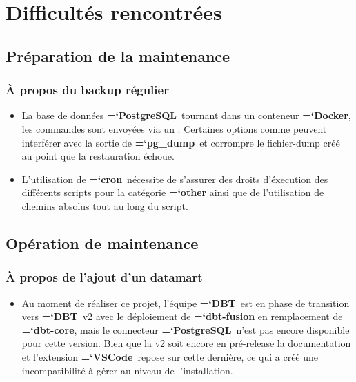 \documentclass[11pt]{article}
\newcommand{\inlinecode}[1]{\tcbox{\ttfamily\hyphenchar\font=`\-\color{codegray}#1}}
\newcommand{\program}[1]{{\ttfamily\bfseries\hyphenchar\font=`\-\color{Maroon}#1}}
\newcommand{\techno}[1]{{\ttfamily\bfseries\hyphenchar\font=`\-\color{Sienna}#1}}
\newcommand{\role}[1]{\colorbox{backcolor}{\ttfamily\bfseries\hyphenchar\font=`\-\color{ForestGreen}#1}}
\newcommand{\docker}{\techno{Docker}}
\newcommand{\postgresql}{\techno{PostgreSQL}}
\newcommand{\dbt}{\techno{DBT}}
\newcommand{\cron}{\program{cron}}
\newcommand{\pgdump}{\program{pg\_dump}}
\newcommand{\vscode}{\program{VSCode}}
\begin{document}
\section{Difficultés rencontrées}

\subsection{Préparation de la maintenance}

\subsubsection{À propos du backup régulier} \label{ann:backup_regulier_difficultes}

\begin{itemize}
    \item La base de données \postgresql\ tournant dans un conteneur \docker, les commandes sont envoyées via un \inlinecode{docker exec}. Certaines options comme \inlinecode{-t} peuvent interférer avec la sortie de \pgdump\ et corrompre le fichier-dump créé au point que la restauration échoue.
    \item L'utilisation de \cron\ nécessite de s'assurer des droits d'éxecution des différents scripts pour la catégorie \role{other} ainsi que de l'utilisation de chemins absolus tout au long du script.
\end{itemize}


\subsection{Opération de maintenance}

\subsubsection{À propos de l'ajout d'un datamart} \label{ann:ajout_datamart_difficultes}

\begin{itemize}
    \item Au moment de réaliser ce projet, l'équipe \dbt\ est en phase de transition vers \dbt\ v2 avec le déploiement de \techno{dbt-fusion} en remplacement de \techno{dbt-core}, mais le connecteur \postgresql\ n'est pas encore disponible pour cette version. Bien que la v2 soit encore en pré-release la documentation et l'extension \vscode\ repose sur cette dernière, ce qui a créé une incompatibilité à gérer au niveau de l'installation.
\end{itemize}
\end{document}
